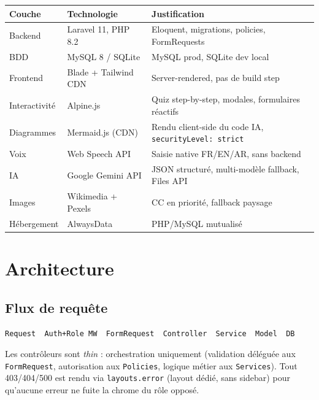 \documentclass[10pt,a4paper]{article}
\begin{document}
\begin{table}[H]
\centering\renewcommand{\arraystretch}{1.3}
\begin{tabularx}{\textwidth}{p{2.5cm} p{3.2cm} X}
\toprule \textbf{Couche} & \textbf{Technologie} & \textbf{Justification} \\ \midrule
Backend & Laravel 11, PHP 8.2 & Eloquent, migrations, policies, FormRequests \\
BDD & MySQL 8 / SQLite & MySQL prod, SQLite dev local \\
Frontend & Blade + Tailwind CDN & Server-rendered, pas de build step \\
Interactivit\'e & Alpine.js & Quiz step-by-step, modales, formulaires r\'eactifs \\
Diagrammes & Mermaid.js (CDN) & Rendu client-side du code IA, \texttt{securityLevel: strict} \\
Voix & Web Speech API & Saisie native FR/EN/AR, sans backend \\
IA & Google Gemini API & JSON structur\'e, multi-mod\`ele fallback, Files API \\
Images & Wikimedia + Pexels & CC en priorit\'e, fallback paysage \\
H\'ebergement & AlwaysData & PHP/MySQL mutualis\'e \\
\bottomrule
\end{tabularx}
\end{table}

\section{Architecture}

\subsection{Flux de requ\^ete}
\begin{center}
\texttt{Request \textrightarrow\ Auth+Role MW \textrightarrow\ FormRequest \textrightarrow\ Controller \textrightarrow\ Service \textrightarrow\ Model \textrightarrow\ DB}
\end{center}

Les contr\^oleurs sont \emph{thin} : orchestration uniquement (validation d\'el\'egu\'ee aux \texttt{FormRequest}, autorisation aux \texttt{Policies}, logique m\'etier aux \texttt{Services}). Tout 403/404/500 est rendu via \texttt{layouts.error} (layout d\'edi\'e, sans sidebar) pour qu'aucune erreur ne fuite la chrome du r\^ole oppos\'e.
\end{document}
